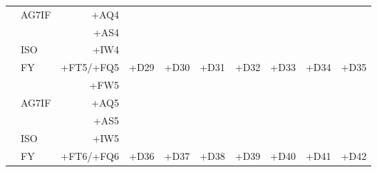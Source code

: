\begin{center}
{\begin{tabular}{|c|lr|c|c|c|c|c|c|c|}
                        & AG7IF &      +AQ4 &                            &                            &                            &                            &                            &                            &                            \\
                        &       &      +AS4 &                            &                            &                            &                            &                            &                            &                            \\
                        & ISO   &      +IW4 &                            &                            &                            &                            &                            &                            &                            \\
\hline
    \multirow{5}{0.5in}{} & FY    & +FT5/+FQ5 & \multirow[t]{5}{1in}{+D29} & \multirow[t]{5}{1in}{+D30} & \multirow[t]{5}{1in}{+D31} & \multirow[t]{5}{1in}{+D32} & \multirow[t]{5}{1in}{+D33} & \multirow[t]{5}{1in}{+D34} & \multirow[t]{5}{1in}{+D35} \\
                        &       &      +FW5 &                            &                            &                            &                            &                            &                            &                            \\
                        & AG7IF &      +AQ5 &                            &                            &                            &                            &                            &                            &                            \\
                        &       &      +AS5 &                            &                            &                            &                            &                            &                            &                            \\
                        & ISO   &      +IW5 &                            &                            &                            &                            &                            &                            &                            \\
\hline
    \multirow{5}{0.5in}{} & FY    & +FT6/+FQ6 & \multirow[t]{5}{1in}{+D36} & \multirow[t]{5}{1in}{+D37} & \multirow[t]{5}{1in}{+D38} & \multirow[t]{5}{1in}{+D39} & \multirow[t]{5}{1in}{+D40} & \multirow[t]{5}{1in}{+D41} & \multirow[t]{5}{1in}{+D42} \\

\end{tabular}}
\end{center}
